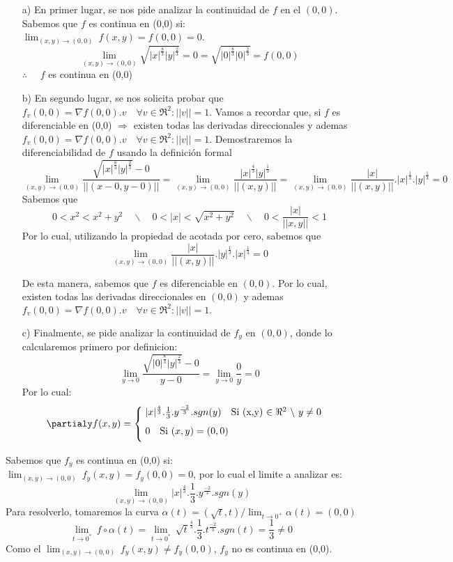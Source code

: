\begin{solution}
\begin{itemize}
    \item[a)] En primer lugar, se nos pide analizar la continuidad de $f$ en el $(0,0)$. 
Sabemos que $f$ es continua en (0,0) si:  $\lim_{(x,y)\to(0,0)} \ f(x,y) = f(0,0)=0$. 
\[
        \lim_{(x,y)\to (0,0)} \sqrt{|x|^{\frac{8}{3}}|y|^{\frac{2}{3}}}=0=\sqrt{|0|^{\frac{8}{3}}|0|^{\frac{2}{3}}}=f(0,0)
    \]
$\therefore\quad$ $f$ es continua en (0,0)

    \item[b)] En segundo lugar, se nos solicita probar que $f_v(0,0)=\nabla f(0,0).v \quad \forall v \in \Re^2: ||v||=1.$ 
Vamos a recordar que, si $f$ es diferenciable en (0,0) $\Rightarrow $ existen todas las derivadas direccionales y ademas $f_v(0,0)=\nabla f(0,0).v \quad \forall v \in \Re^2: ||v||=1.$ Demostraremos la diferenciabilidad de $f$ usando la definición formal 
\[
        \lim_{(x,y)\to (0,0)} \frac{\sqrt{|x|^{\frac{8}{3}}|y|^{\frac{2}{3}}}-0}{||(x-0,y-0)||}= \lim_{(x,y)\to (0,0)} \frac{|x|^{\frac{4}{3}}|y|^{\frac{1}{3}}}{||(x,y)||}= \lim_{(x,y)\to (0,0)} \frac{|x|}{||(x,y)||}.|x|^{\frac{1}{3}}.|y|^{\frac{1}{3}}=0
    \]
Sabemos que
\[
        0<x^2<x^2+y^2 \quad\backslash\quad  0<|x|<\sqrt{x^2+y^2} \quad\backslash\quad  0<\frac{|x|}{||x,y||}<1
    \]
Por lo cual, utilizando la propiedad de acotada por cero, sabemos que
\[
        \lim_{(x,y)\to (0,0)} \frac{|x|}{||(x,y)||}.|y|^{\frac{1}{3}}.|x|^{\frac{1}{3}}=0
    \]

De esta manera, sabemos que $f$ es diferenciable en $(0,0)$. Por lo cual, existen todas las derivadas direccionales en $(0,0)$ y ademas $f_v(0,0)=\nabla f(0,0).v \quad \forall v \in \Re^2: ||v||=1.$ 
      \item[c)] Finalmente, se pide analizar la continuidad de $f_y $ en $(0,0)$, donde lo calcularemos primero por definicion:
\[
         \lim_{y\to0} \frac{\sqrt{|0|^{\frac{8}{3}}|y|^{\frac{2}{3}}}-0}{y-0}=\lim_{y\to0} \frac{0}{y}=0
    \]
    Por lo cual:
    \[
     \partialy f(x,y)= \begin{cases}
            \;|x|^\frac{4}{3} .\frac{1}{3}.y^\frac{-2}{3}.sgn(y) \quad \text{Si (x,y) $\in \Re^2$ $\backslash$ $y\neq0$} \\[5pt]
            \;0\quad \text{Si $(x,y)=(0,0)$}\\[5pt] 
        \end{cases}
    \]
\end{itemize}
Sabemos que $f_y$ es continua en (0,0) si:  $\lim_{(x,y)\to(0,0)} \ f_y(x,y) = f_y(0,0)=0$, por lo cual el limite a analizar es: 
\[
        \lim_{(x,y)\to (0,0)} |x|^\frac{4}{3} .\frac{1}{3}.y^\frac{-2}{3}.sgn(y)
    \]
Para resolverlo, tomaremos la curva $\alpha(t)=(\sqrt{t},t) / \lim_{t\to0^+} \alpha(t) = (0,0)$
    \[
         \lim_{t\to0^*} \
          f\circ\alpha(t)=\lim_{t\to0^*} \
         \sqrt{t}^\frac{4}{3} .\frac{1}{3}.t^\frac{-2}{3}.sgn(t)=\frac{1}{3}\neq0
    \]
    Como el $\lim_{(x,y)\to(0,0)} \ f_y(x,y) \neq f_y(0,0)$, $f_y$ no es continua en (0,0).
\end{solution}
